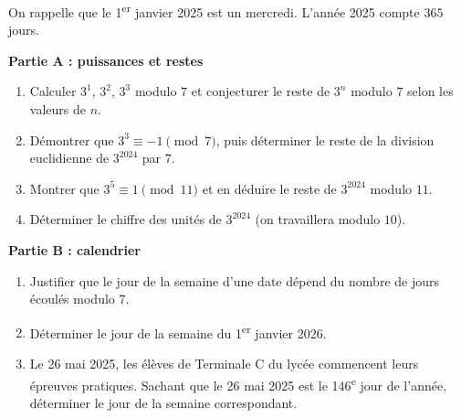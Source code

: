 \documentclass[11pt]{article}
\begin{document}
\begin{exercice}
On rappelle que le 1\textsuperscript{er} janvier 2025 est un mercredi. L'année 2025 compte $365$ jours.

\textbf{Partie A : puissances et restes}
\begin{enumerate}
\item Calculer $3^1$, $3^2$, $3^3$ modulo $7$ et conjecturer le reste de $3^n$ modulo $7$ selon les valeurs de $n$.
\item Démontrer que $3^3 \equiv -1 \pmod{7}$, puis déterminer le reste de la division euclidienne de $3^{2024}$ par $7$.
\item Montrer que $3^5 \equiv 1 \pmod{11}$ et en déduire le reste de $3^{2024}$ modulo $11$.
\item Déterminer le chiffre des unités de $3^{2024}$ (on travaillera modulo $10$).
\end{enumerate}

\textbf{Partie B : calendrier}
\begin{enumerate}
\item Justifier que le jour de la semaine d'une date dépend du nombre de jours écoulés modulo $7$.
\item Déterminer le jour de la semaine du 1\textsuperscript{er} janvier 2026.
\item Le 26 mai 2025, les élèves de Terminale C du lycée commencent leurs épreuves pratiques. Sachant que le 26 mai 2025 est le 146\textsuperscript{e} jour de l'année, déterminer le jour de la semaine correspondant.
\end{enumerate}
\end{exercice}
\end{document}
